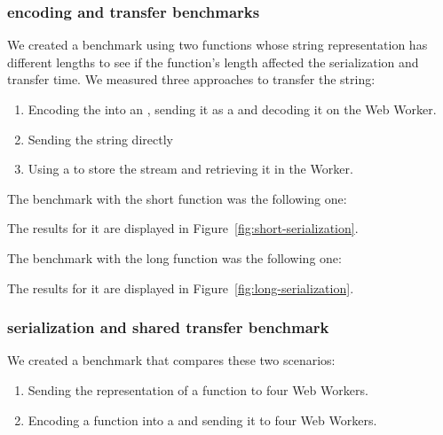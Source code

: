\subsubsection{\tstring{} encoding and transfer benchmarks}
We created a benchmark using two functions whose string representation has different lengths to see if the function's length affected the serialization and transfer time. We measured three approaches to transfer the string:
\begin{enumerate}
  \item Encoding the \tstring{} into an \tabuffer{}, sending it as a  and decoding it on the Web Worker.
  \item Sending the string directly
  \item Using a  to store the stream and retrieving it in the Worker.
\end{enumerate}

The benchmark with the short function was the following one:

The results for it are displayed in Figure~\ref{fig:short-serialization}.

The benchmark with the long function was the following one:

The results for it are displayed in Figure~\ref{fig:long-serialization}.

\subsubsection{\tstring{} serialization and shared transfer benchmark}

We created a benchmark that compares these two scenarios:

\begin{enumerate}
\item Sending the \tstring{} representation of a function to four Web Workers.
\item Encoding a function into a \tsabuffer{} and sending it to four Web Workers.
\end{enumerate}

